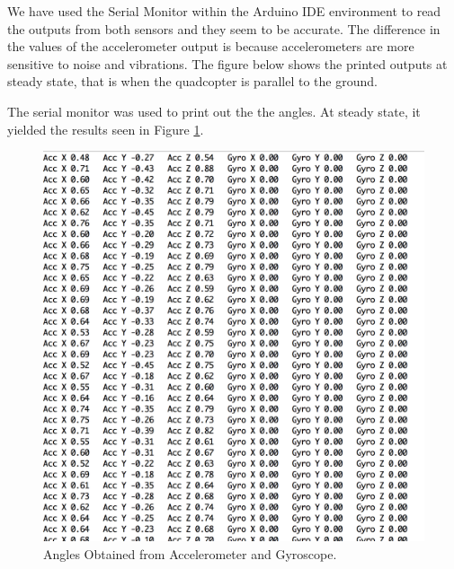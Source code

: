 



We have used the Serial Monitor within the Arduino IDE environment to read the outputs from both sensors and they seem to be accurate. The difference in the values of the accelerometer output is because accelerometers are more sensitive to noise and vibrations. The figure below shows the printed outputs at steady state, that is when the quadcopter is parallel to the ground.

The serial monitor was used to print out the the angles. At steady state, it yielded the results seen in Figure \ref{angles}.

\begin{figure}[H]
  \centering
    \includegraphics[width=1\textwidth]{images/accgy.png}
	\caption{Angles Obtained from Accelerometer and Gyroscope.}
	\label{angles}
\end{figure}

